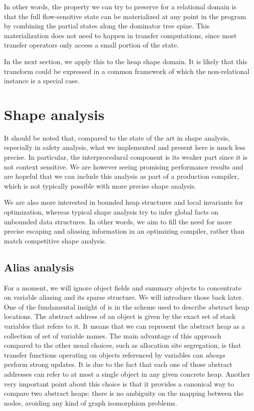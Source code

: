\documentclass[11pt]{article}
\begin{document}
In other words, the property we can try to preserve for a relational domain is that the full flow-sensitive state can be materialized at any point in the program by combining the partial states along the dominator tree spine.
This materialization does not need to happen in transfer computations, since most transfer operators only access a small portion of the state.

In the next section, we apply this to the heap shape domain.
It is likely that this transform could be expressed in a common framework of which the non-relational instance is a special case.

\section*{Shape analysis}

It should be noted that, compared to the state of the art in shape analysis, especially in safety analysis, what we implemented and present here is much less precise.
In particular, the interprocedural component is its weaker part since it is not context sensitive.
We are however seeing promising performance results and are hopeful that we can include this analysis as part of a production compiler, which is not typically possible with more precise shape analysis.

We are also more interested in bounded heap structures and local invariants for optimization, whereas typical shape analysis try to infer global facts on unbounded data structures. In other words, we aim to fill the need for more precise escaping and aliasing information in an optimizing compiler, rather than match competitive shape analysis.

\subsection*{Alias analysis}
For a moment, we will ignore object fields and summary objects to concentrate on variable aliasing and its sparse structure. We will introduce those back later.
One of the fundamental insight of \cite{ssc} is in the scheme used to describe abstract heap locations.
The abstract address of an object is given by the exact set of stack variables that refers to it.
It means that we can represent the abstract heap as a collection of set of variable names.
The main advantage of this approach compared to the other usual choices, such as allocation site segregation, is that transfer functions operating on objects referenced by variables can \emph{always} perform strong updates.
It is due to the fact that each one of those abstract addresses can refer to at most a single object in any given concrete heap.
Another very important point about this choice is that it provides a canonical way to compare two abstract heaps: there is no ambiguity on the mapping between the nodes, avoiding any kind of graph isomorphism problems.
\end{document}
